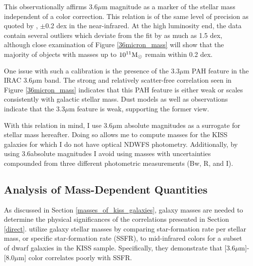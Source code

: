 This observationally affirms 3.6$\mu$m magnitude as a marker of the stellar mass independent of a color correction. This relation is of the same level of precision as quoted by \cite{Bell}, $\pm$0.2 dex in the near-infrared. At the high luminosity end, the data contain several outliers which deviate from the fit by as much as 1.5 dex, although close examination of Figure \ref{36micron_mass} will show that the majority of objects with masses up to $\rm{10}^{\rm{11}}\rm{M}_\odot$ remain within 0.2 dex.

One issue with such a calibration is the presence of the 3.3$\mu$m PAH feature in the IRAC 3.6$\mu$m band. The strong and relatively scatter-free correlation seen in Figure \ref{36micron_mass} indicates that this PAH feature is either weak or scales consistently with galactic stellar mass. Dust models \citep{LiDraine,DraineLi} as well as observations \citep{Siana,Imanishi2006,Imanishi2007} indicate that the 3.3$\mu$m feature is weak, supporting the former view.

With this relation in mind, I use 3.6$\mu$m absolute magnitudes as a surrogate for stellar mass hereafter.  Doing so allows me to compute masses for the KISS galaxies for which I do not have optical NDWFS photometry. Additionally, by using 3.6\micron absolute magnitudes I avoid using masses with uncertainties compounded from three different photometric measurements (Bw, R, and I).

\subsection{Analysis of Mass-Dependent Quantities}
\label{sec:specific}

As discussed in Section \ref{masses_of_kiss_galaxies}, galaxy masses are needed to determine the physical significances of the correlations presented in Section \ref{direct}.  \cite{Hong} utilize galaxy stellar masses by comparing star-formation rate per stellar mass, or specific star-formation rate (SSFR), to mid-infrared colors for a subset of dwarf galaxies in the KISS sample. Specifically, they demonstrate that [3.6$\mu$m]-[8.0$\mu$m] color correlates poorly with SSFR.

